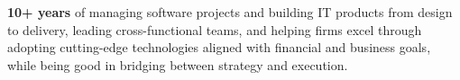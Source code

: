 
\begin{cvparagraph}
\textbf{10+ years} of managing software projects and building IT products from design to delivery, leading cross-functional teams, and helping firms excel through adopting cutting-edge technologies aligned with financial and business goals, while being good in bridging between strategy and execution.
\end{cvparagraph}
